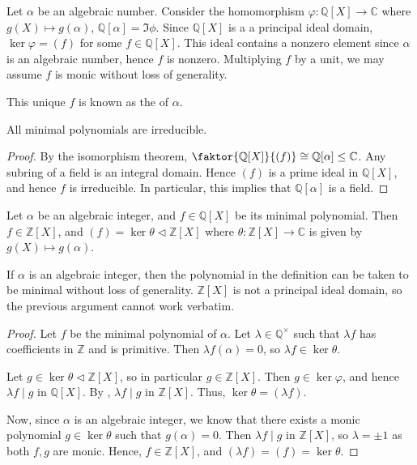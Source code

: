 \begin{definition}
	Let $\alpha$ be an algebraic number.
	Consider the homomorphism $\varphi : \mathbb Q[X] \to \mathbb C$ where $g(X) \mapsto g(\alpha)$, $\mathbb{Q}[\alpha] = \Im \phi$.
	Since $\mathbb Q[X]$ is a a principal ideal domain, $\ker \varphi = (f)$ for some $f \in \mathbb Q[X]$.
	This ideal contains a nonzero element since $\alpha$ is an algebraic number, hence $f$ is nonzero.
	Multiplying $f$ by a unit, we may assume $f$ is monic without loss of generality.

	This unique $f$ is known as the  of $\alpha$.
\end{definition} 

\begin{corollary}
	All minimal polynomials are irreducible.
\end{corollary}

\begin{proof}
	By the isomorphism theorem, $\faktor{\mathbb Q[X]}{(f)} \cong \mathbb Q[\alpha] \leq \mathbb C$.
	Any subring of a field is an integral domain.
	Hence $(f)$ is a prime ideal in $\mathbb Q[X]$, and hence $f$ is irreducible.
	In particular, this implies that $\mathbb Q[\alpha]$ is a field.
\end{proof} 

\begin{proposition} \label{12.4}
	Let $\alpha$ be an algebraic integer, and $f \in \mathbb Q[X]$ be its minimal polynomial.
	Then $f \in \mathbb Z[X]$, and $(f) = \ker \theta \triangleleft \mathbb Z[X]$ where $\theta : \mathbb Z[X] \to \mathbb C$ is given by $g(X) \mapsto g(\alpha)$.
\end{proposition}

\begin{remark}
	If $\alpha$ is an algebraic integer, then the polynomial in the definition can be taken to be minimal without loss of generality.
	$\mathbb Z[X]$ is not a principal ideal domain, so the previous argument cannot work verbatim.
\end{remark}

\begin{proof}
	Let $f$ be the minimal polynomial of $\alpha$.
	Let $\lambda \in \mathbb Q^\times$ such that $\lambda f$ has coefficients in $\mathbb Z$ and is primitive.
	Then $\lambda f(\alpha) = 0$, so $\lambda f \in \ker \theta$.

	Let $g \in \ker \theta \triangleleft \mathbb{Z}[X]$, so in particular $g \in \mathbb Z[X]$.
	Then $g \in \ker \varphi$, and hence $\lambda f \mid g$ in $\mathbb Q[X]$.
	By , $\lambda f \mid g$ in $\mathbb Z[X]$.
	Thus, $\ker \theta = (\lambda f)$.

	Now, since $\alpha$ is an algebraic integer, we know that there exists a monic polynomial $g \in \ker \theta$ such that $g(\alpha) = 0$.
	Then $\lambda f \mid g$ in $\mathbb Z[X]$, so $\lambda = \pm 1$ as both $f, g$ are monic.
	Hence, $f \in \mathbb Z[X]$, and $(\lambda f) = (f) = \ker \theta$.
\end{proof}

